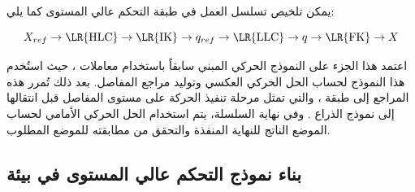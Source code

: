 \begin{figure}[H]
{
}
\caption{}
\label{fig:general_hlc_block_diagram}
\end{figure}

يمكن تلخيص تسلسل العمل في طبقة التحكم عالي المستوى كما يلي:

\[
X_{ref}
\rightarrow
\text{\LR{HLC}}
\rightarrow
\text{\LR{IK}}
\rightarrow
q_{ref}
\rightarrow
\text{\LR{LLC}}
\rightarrow
q
\rightarrow
\text{\LR{FK}}
\rightarrow
X
\]

اعتمد هذا الجزء على النموذج الحركي المبني سابقاً باستخدام معاملات ، حيث استُخدم هذا النموذج لحساب الحل الحركي العكسي وتوليد مراجع المفاصل. بعد ذلك تُمرر هذه المراجع إلى طبقة ، والتي تمثل مرحلة تنفيذ الحركة على مستوى المفاصل قبل انتقالها إلى نموذج الذراع . وفي نهاية السلسلة، يتم استخدام الحل الحركي الأمامي  لحساب الموضع الناتج للنهاية المنفذة والتحقق من مطابقته للموضع المطلوب.






\subsection{بناء نموذج التحكم عالي المستوى في بيئة }
\label{subsec:hlc_simulink_model}

